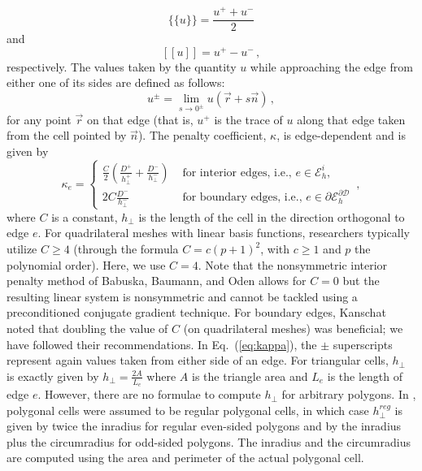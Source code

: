 \documentclass[preprint,10pt]{elsarticle}
\newcommand{\jmp}[1]{[\![#1]\!]}                     %
\newcommand{\mvl}[1]{\{\!\!\{#1\}\!\!\}}             %
\newcommand{\D}{\mathcal{D}}
\newcommand{\vr}{\vec{r}}
\newcommand{\vn}{\vec{n}}
\newcommand{\EI}{\mathcal{E}_h^i}
\newcommand{\reg}{\textit{reg}}
\newcommand{\eqt}[1]{Eq.~(\ref{#1})}                     %
\newcommand{\tf}{b}
\begin{document}
\begin{equation} \label{eq:mean}
\mvl{u} = \frac{u^+ + u^-}{2}
\end{equation}
and
\begin{equation} \label{eq:jump}
\jmp{u} = u^+ - u^- \, ,
\end{equation}
respectively.  The values taken by the quantity $u$ while approaching the edge from either one of its sides are defined as follows:
\begin{equation} \label{eq:upm}
u^\pm = \lim_{s\to 0^\pm} u(\vr + s \vn) \, ,
\end{equation}
for any point $\vr$ on that edge (that is, $u^+$ is the trace of $u$ along that edge taken from the cell pointed by $\vn$).
%
The penalty coefficient, $\kappa$, is edge-dependent and is given by
\begin{equation} \label{eq:kappa}
  \kappa_e = \left\{
    \begin{array}{ll}
      \frac{C}{2} \left( \frac{D^+}{h_\bot^+} + \frac{D^-}{h_\bot^-} \right) & \textrm{ for interior edges, i.e., } e \in \EI,\\
      2C \frac{D^-}{h_\bot^-}  & \textrm{ for boundary edges, i.e., } e \in \partial \mathcal{E}_h^{\partial\D}
    \end{array}
    \right. \, ,
\end{equation}
where $C$ is a constant, $h_{\bot}$ is the length of the cell in the direction 
orthogonal to edge $e$. 
For quadrilateral meshes with linear basis functions, researchers typically utilize $C \ge 4$ 
(through the formula $C=c(p+1)^2$, with $c\ge 1$ and $p$ the polynomial order).  Here, we use $C=4$.
Note that the nonsymmetric interior penalty method of Babuska, Baumann, and Oden \cite{Babuska1999103}
allows for $C=0$ but the resulting linear system is nonsymmetric and cannot be tackled using a 
preconditioned conjugate gradient technique.
For boundary edges, 
Kanschat \cite{Kanschat2007} noted that doubling the value of $C$ (on quadrilateral meshes) was 
beneficial; we have followed their recommendations. In \eqt{eq:kappa}, the $\pm$ superscripts 
represent again values taken from either side of an edge. For triangular cells, $h_\bot$ is exactly 
given by $h_{\bot}=\frac{2A}{L_e}$ where $A$ is the triangle area and $L_e$ is the length of edge $e$. 
However, there are no formulae to compute $h_{\bot}$ for arbitrary polygons. In \cite{BT-PhD}, 
polygonal cells were assumed to be regular polygonal cells, in which case $h_{\bot}^\reg$ is given
by twice the inradius for regular even-sided polygons and by the inradius plus the 
circumradius for odd-sided polygons. The inradius and the circumradius are computed 
using the area and perimeter of the actual polygonal cell. 
\end{document}
